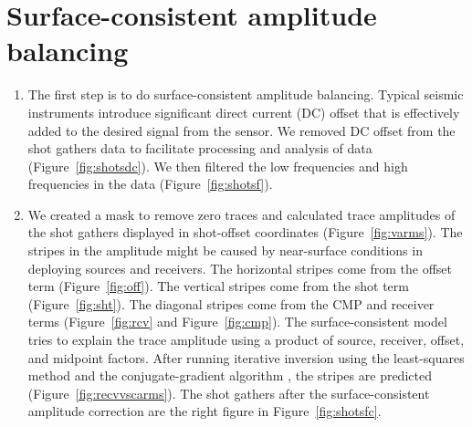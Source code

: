 \section{Surface-consistent amplitude balancing}

\begin{enumerate}

\item The first step is to do surface-consistent amplitude balancing. Typical seismic instruments introduce significant direct current (DC) offset that is effectively added to the desired signal from the sensor. We removed DC offset from the shot gathers data to facilitate processing and analysis of data (Figure~\ref{fig:shotsdc}). We then filtered the low frequencies and high frequencies in the data (Figure~\ref{fig:shotsf}).

\item We created a mask to remove zero traces and calculated trace amplitudes of the shot gathers displayed in shot-offset coordinates (Figure~\ref{fig:varms}). The stripes in the amplitude might be caused by near-surface conditions in deploying sources and receivers. The horizontal stripes come from the offset term (Figure~\ref{fig:off}). The vertical stripes come from the shot term (Figure~\ref{fig:sht}). The diagonal stripes come from the CMP and receiver terms (Figure~\ref{fig:rcv} and Figure~\ref{fig:cmp}). The surface-consistent model \cite[]{GEO46-01-00170022} tries to explain the trace amplitude using a product of source, receiver, offset, and midpoint factors. After running iterative inversion using the least-squares method and the conjugate-gradient algorithm \cite[]{hestenes,fletcher}, the stripes are predicted (Figure~\ref{fig:recvvscarms}). The shot gathers after the surface-consistent amplitude correction are the right figure in Figure~\ref{fig:shotsfc}.          


\end{enumerate}\clearpage

